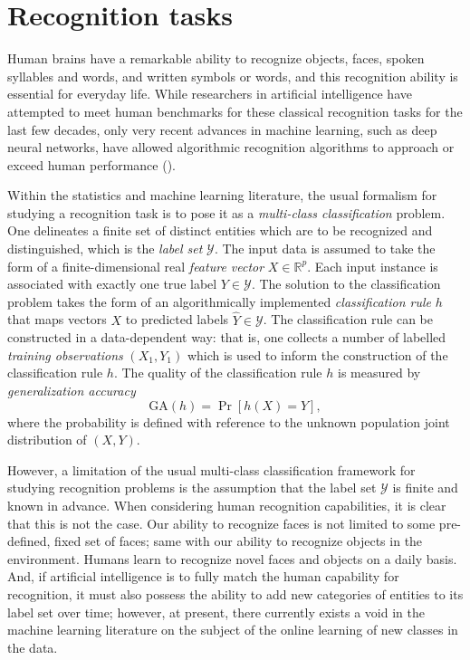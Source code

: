 \documentclass[12pt]{article}
\begin{document}
\section{Recognition tasks}\label{sec:recog_tasks}

Human brains have a remarkable ability to recognize objects, faces,
spoken syllables and words, and written symbols or words, and this
recognition ability is essential for everyday life.  While researchers
in artificial intelligence have attempted to meet human benchmarks for
these classical recognition tasks for the last few decades, only very
recent advances in machine learning, such as deep neural networks,
have allowed algorithmic recognition algorithms to approach or exceed
human performance (\cite{lecun2015deep}).

Within the statistics and machine learning literature, the usual
formalism for studying a recognition task is to pose it as a
\emph{multi-class classification} problem.  One delineates a finite
set of distinct entities which are to be recognized and distinguished,
which is the \emph{label set} $\mathcal{Y}$.  The input data is
assumed to take the form of a finite-dimensional real \emph{feature
  vector} $X \in \mathbb{R}^p$.  Each input instance is associated
with exactly one true label $Y \in \mathcal{Y}$.  The solution to the
classification problem takes the form of an algorithmically
implemented \emph{classification rule} $h$ that maps vectors $X$ to
predicted labels $\hat{Y} \in \mathcal{Y}$.  The classification rule
can be constructed in a data-dependent way: that is, one collects a
number of labelled \emph{training observations} $(X_1, Y_1)$ which is
used to inform the construction of the classification rule $h$.  The
quality of the classification rule $h$ is measured by \emph{generalization accuracy}
\[
\text{GA}(h) = \Pr[h(X) = Y],
\]
where the probability is defined with reference to the unknown
population joint distribution of $(X, Y)$.  

However, a limitation of the usual multi-class classification
framework for studying recognition problems is the assumption that the
label set $\mathcal{Y}$ is finite and known in advance.  When
considering human recognition capabilities, it is clear that this is
not the case.  Our ability to recognize faces is not limited to some
pre-defined, fixed set of faces; same with our ability to recognize
objects in the environment.  Humans learn to recognize novel faces and
objects on a daily basis.  And, if artificial intelligence is to fully
match the human capability for recognition, it must also possess the
ability to add new categories of entities to its label set over time;
however, at present, there currently exists a void in the machine
learning literature on the subject of the online learning of new
classes in the data.
\end{document}
